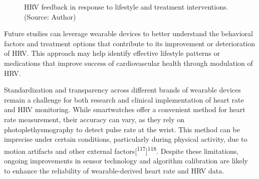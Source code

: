 \documentclass[
  a4paper,
  headsepline=true,
  open=any]{scrbook}
\begin{document}
\begin{figure}

\begin{minipage}[t]{\linewidth}

{\centering 


\caption{HRV feedback in response to lifestyle and treatment
interventions. (Source: Author)}

}

\end{minipage}%

\end{figure}

Future studies can leverage wearable devices to better understand the
behavioral factors and treatment options that contribute to its
improvement or deterioration of HRV. This approach may help identify
effective lifestyle patterns or medications that improve success of
cardiovascular health through modulation of HRV.

Standardization and transparency across different brands of wearable
devices remain a challenge for both research and clinical implementation
of heart rate and HRV monitoring. While smartwatches offer a convenient
method for heart rate measurement, their accuracy can vary, as they rely
on photoplethysmography to detect pulse rate at the wrist. This method
can be imprecise under certain conditions, particularly during physical
activity, due to motion artifacts and other external
factors{[}\textsuperscript{117}{]}\textsuperscript{118}. Despite these
limitations, ongoing improvements in sensor technology and algorithm
calibration are likely to enhance the reliability of wearable-derived
heart rate and HRV data.
\end{document}
